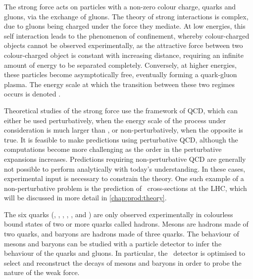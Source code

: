 The strong force acts on particles with a non-zero colour charge, quarks and gluons, via the 
exchange of gluons.
The theory of strong interactions is complex, due to gluons being charged under 
the force they mediate.
At low energies, this self interaction leads to the phenomenon of confinement, 
whereby colour-charged objects cannot be observed experimentally, as the 
attractive force between two colour-charged object is constant with increasing 
distance, requiring an infinite amount of energy to be separated completely.
Conversely, at higher energies, these particles become asymptotically free, 
eventually forming a quark-gluon plasma.
The energy scale at which the transition between these two regimes occurs is 
denoted \qcdscale.

Theoretical studies of the strong force use the framework of \ac{QCD}, which 
can either be used perturbatively, when the energy scale of the process under 
consideration is much larger than \qcdscale, or non-perturbatively, when the 
opposite is true.
It is feasible to make predictions using perturbative \ac{QCD}, although the 
computations become more challenging as the order in the perturbative 
expansions increases.
Predictions requiring non-perturbative \ac{QCD} are generally not possible to 
perform analytically with today's understanding.
In these cases, experimental input is necessary to constrain the theory.
One such example of a non-perturbative problem is the prediction of \pp\ 
cross-sections at the \ac{LHC}, which will be discussed in more detail in 
\cref{chap:prod:theory}.

The six quarks (\Pup, \Pdown, \Pcharm, \Pstrange, \Ptop, and \Pbottom) are only 
observed experimentally in colourless bound states of two or more quarks called 
hadrons.
Mesons are hadrons made of two quarks, and baryons are hadrons made of three 
quarks.
The behaviour of mesons and baryons can be studied with a particle detector to 
infer the behaviour of the quarks and gluons.
In particular, the \lhcb\ detector is optimised to select and reconstruct the 
decays of mesons and baryons in order to probe the nature of the weak force.

